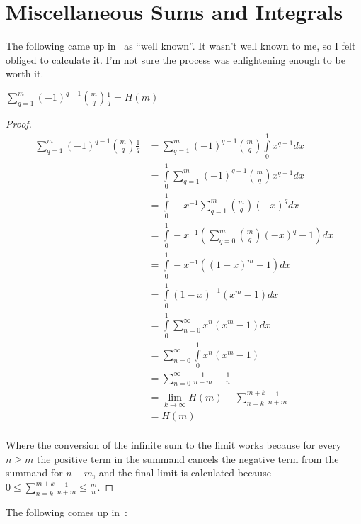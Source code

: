 \chapter{Miscellaneous Sums and Integrals}

The following came up in~\cite{DBLP:journals/dam/FlajoletGT92} as ``well known''.
It wasn't well known to me,
so I felt obliged to calculate it.
I'm not sure the process was enlightening enough to be worth it.

\begin{proposition}
\(\sum\limits_{q = 1}^m {(-1)}^{q - 1} {m \choose q} \frac{1}{q} = H(m)\)
\end{proposition}

\begin{proof}
\begin{align*}
\sum\limits_{q = 1}^m {(-1)}^{q - 1} {m \choose q} \frac{1}{q} &= \sum\limits_{q = 1}^m {(-1)}^{q - 1} {m \choose q} \int\limits_0^1 x^{q - 1} dx\\
&= \int\limits_0^1 \sum\limits_{q = 1}^m {(-1)}^{q - 1} {m \choose q} x^{q - 1} dx\\
&= \int\limits_0^1 -x^{-1} \sum\limits_{q = 1}^m {m \choose q} {(-x)}^q dx\\
&= \int\limits_0^1 -x^{-1} \left( \sum\limits_{q = 0}^m {m \choose q} {(-x)}^q - 1 \right)dx \\
&= \int\limits_0^1 -x^{-1} \left( {(1 - x)}^m - 1 \right)dx \\
&= \int\limits_0^1 {(1 - x)}^{-1} (x^m - 1) dx \\
&= \int\limits_0^1 \sum\limits_{n = 0}^\infty x^n (x^m - 1) dx \\
&= \sum\limits_{n = 0}^\infty \int\limits_0^1 x^n (x^m - 1) \\
&= \sum\limits_{n = 0}^\infty \frac{1}{n + m} - \frac{1}{n} \\
&= \lim\limits_{k \to \infty}  H(m) - \sum\limits_{n = k}^{m + k} \frac{1}{n + m}\\
&= H(m)\\
\end{align*}

Where the conversion of the infinite sum to the limit works because for every \(n \geq m\) the positive term in the summand cancels the negative term from the summand for \(n - m\),
and the final limit is calculated because \(0 \leq \sum\limits_{n = k}^{m + k} \frac{1}{n + m} \leq \frac{m}{n}\).
\end{proof}

The following comes up in~\cite{1410.5002}:

